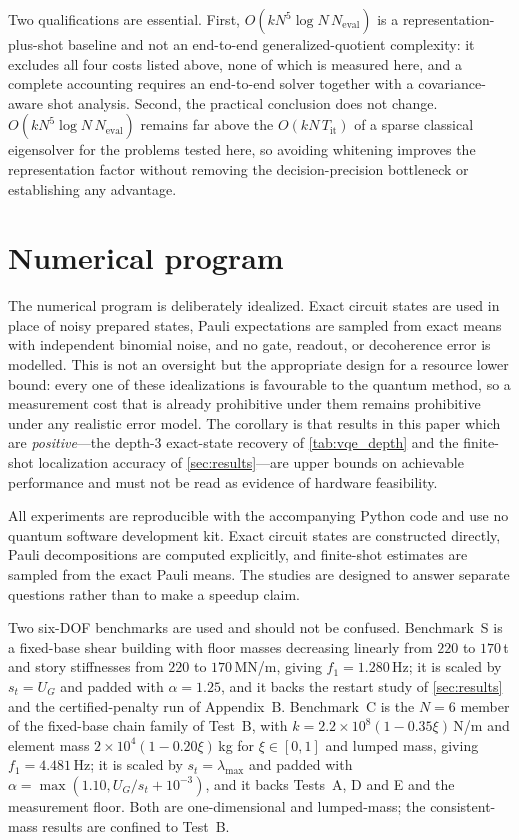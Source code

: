\documentclass{ieeeaccess}
\begin{document}
Two qualifications are essential. First, $O(kN^5\log N\,N_{\mathrm{eval}})$ is a
representation-plus-shot baseline and not an end-to-end generalized-quotient complexity: it
excludes all four costs listed above, none of which is measured here, and a complete accounting
requires an end-to-end solver together with a covariance-aware shot analysis. Second, the
practical conclusion does not change. $O(kN^5\log N\,N_{\mathrm{eval}})$ remains far above the
$O(kN\,T_{\mathrm{it}})$ of a sparse classical eigensolver for the problems tested here, so
avoiding whitening improves the representation factor without removing the decision-precision
bottleneck or establishing any advantage.

\section{Numerical program}
\label{sec:numerical}

The numerical program is deliberately idealized. Exact circuit states are used in place of noisy prepared states, Pauli expectations are sampled from exact means with independent binomial noise, and no gate, readout, or decoherence error is modelled. This is not an oversight but the appropriate design for a resource lower bound: every one of these idealizations is favourable to the quantum method, so a measurement cost that is already prohibitive under them remains prohibitive under any realistic error model. The corollary is that results in this paper which are \emph{positive}---the depth-3 exact-state recovery of \cref{tab:vqe_depth} and the finite-shot localization accuracy of \cref{sec:results}---are upper bounds on achievable performance and must not be read as evidence of hardware feasibility.

All experiments are reproducible with the accompanying Python code and use no quantum software development kit. Exact circuit states are constructed directly, Pauli decompositions are computed explicitly, and finite-shot estimates are sampled from the exact Pauli means. The studies are designed to answer separate questions rather than to make a speedup claim.

Two six-DOF benchmarks are used and should not be confused. Benchmark~S is a fixed-base shear building with floor masses decreasing linearly from $220$ to $170$\,t and story stiffnesses from $220$ to $170$\,MN/m, giving $f_1=1.280$\,Hz; it is scaled by $s_t=U_G$ and padded with $\alpha=1.25$, and it backs the restart study of \cref{sec:results} and the certified-penalty run of Appendix~B. Benchmark~C is the $N=6$ member of the fixed-base chain family of Test~B, with $k=2.2\times10^8(1-0.35\xi)$\,N/m and element mass $2\times10^4(1-0.20\xi)$\,kg for $\xi\in[0,1]$ and lumped mass, giving $f_1=4.481$\,Hz; it is scaled by $s_t=\lambda_{\max}$ and padded with $\alpha=\max(1.10,U_G/s_t+10^{-3})$, and it backs Tests~A, D and E and the measurement floor. Both are one-dimensional and lumped-mass; the consistent-mass results are confined to Test~B.
\end{document}
